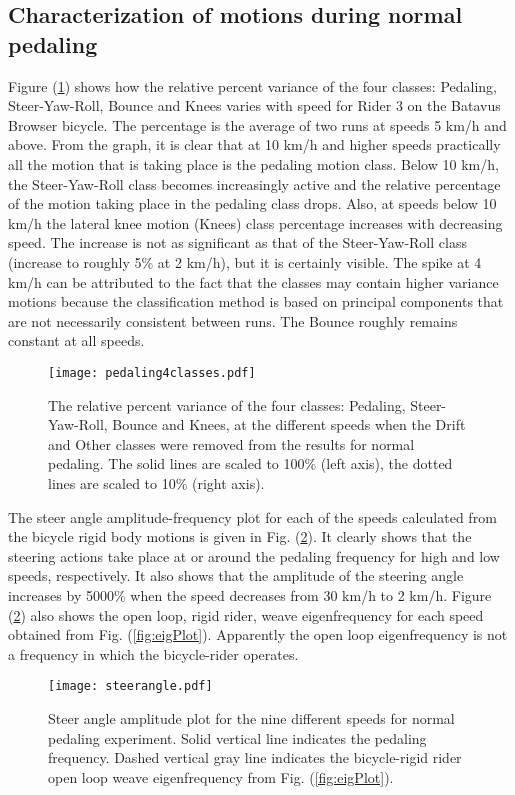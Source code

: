 \documentclass[smallextended]{svjour3}     %
\begin{document}
\subsection{Characterization of motions during normal pedaling}
\label{sec:normalPed}
Figure (\ref{jellybean}) shows how the relative percent variance of the four classes:
Pedaling, Steer-Yaw-Roll, Bounce and Knees varies with speed for Rider 3 on the
Batavus Browser bicycle. The percentage is the average of two runs at speeds 5 km/h and
above. From the graph, it
is clear that at 10 km/h and higher speeds practically all the motion that is
taking place is the pedaling motion class. Below 10 km/h, the Steer-Yaw-Roll
class becomes increasingly active and the relative percentage of the motion
taking place in the pedaling class drops. Also, at speeds below 10 km/h the
lateral knee motion (Knees) class percentage increases with decreasing speed.
The increase is not as significant as that of the Steer-Yaw-Roll class
(increase to roughly 5\% at 2 km/h), but it is certainly visible. The spike at
4 km/h can be attributed to the fact that the classes may contain higher
variance motions because the classification method is based on principal
components that are not necessarily consistent between runs. The Bounce
roughly remains constant at all speeds.
\begin{figure}[tbp]
    \centering
    \texttt{[image: pedaling4classes.pdf]}
    \caption{The relative percent variance of the four classes:
    Pedaling, Steer-Yaw-Roll, Bounce and Knees, at the different speeds when
    the Drift and Other classes were removed from the results for normal
    pedaling. The solid lines are scaled to 100\% (left axis), the dotted lines
    are scaled to 10\% (right axis).}
    \label{jellybean}
\end{figure}

The steer angle amplitude-frequency plot for each of the speeds calculated from
the bicycle rigid body motions is given in Fig. (\ref{pedalsteerangle}). It
clearly shows that the steering actions take place at or around the pedaling
frequency for high and low speeds, respectively. It also shows that the amplitude of the
steering angle increases by 5000\% when the speed decreases from 30 km/h to 2
km/h. Figure (\ref{pedalsteerangle}) also shows the open loop, rigid rider,
weave eigenfrequency for each speed obtained from Fig. (\ref{fig:eigPlot}).
Apparently the open loop eigenfrequency is not a frequency in which the
bicycle-rider operates.
\begin{figure}[tb]
    \centering
        \texttt{[image: steerangle.pdf]}\\
    \caption{Steer angle amplitude plot for the nine different speeds for
    normal pedaling experiment. Solid vertical line indicates the pedaling
    frequency. Dashed vertical gray line indicates the bicycle-rigid rider
    open loop weave eigenfrequency from Fig. (\ref{fig:eigPlot}).}
    \label{pedalsteerangle}
\end{figure}
\end{document}
